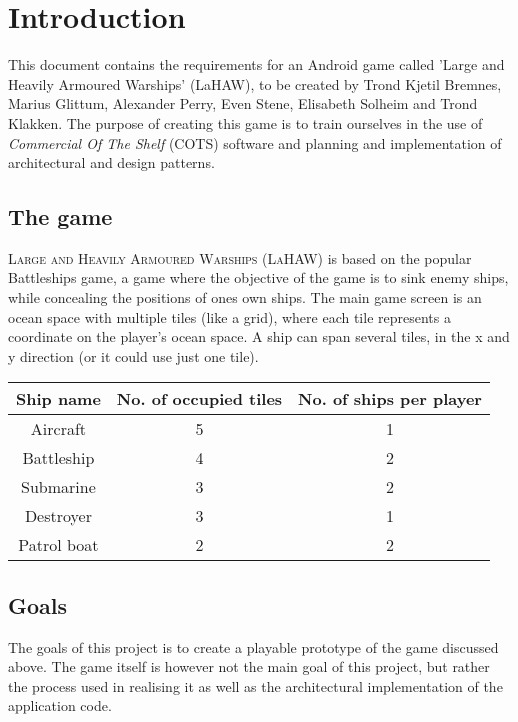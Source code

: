 \chapter{Introduction}
This document contains the requirements for an Android game called 'Large and Heavily Armoured Warships' (LaHAW), to be created by Trond Kjetil Bremnes, Marius Glittum, Alexander Perry, Even Stene, Elisabeth Solheim and Trond Klakken. The purpose of creating this game is to train ourselves in the use of \emph{Commercial Of The Shelf} (COTS) software and planning and implementation of architectural and design patterns.




\section{The game}
\textsc{Large and Heavily Armoured Warships (LaHAW)} is based on the popular Battleships\cite{battleship} game, a game where the objective of the game is to sink enemy ships, while concealing the positions of ones own ships. The main game screen is an ocean space with multiple tiles (like a grid), where each tile represents a coordinate on the player's ocean space. A ship can span several tiles, in the x and y direction (or it could use just one tile). 

\vspace{0.5cm}


\begin{tabular}{| c | c | c |}
    \hline
    \rowcolor[gray]{0.8}
    \hspace{0.3cm}\textbf{Ship name}\hspace{0.3cm} & \textbf{No. of occupied tiles} & \textbf{No. of ships per player} \\
    \hline
    Aircraft & 5 & 1 \\
    Battleship & 4 & 2 \\
    Submarine & 3 & 2 \\
    Destroyer & 3 & 1 \\
    Patrol boat & 2 & 2 \\
    \hline
\end{tabular}
\label{shiptable}





\section{Goals}
The goals of this project is to create a playable prototype of the game discussed above. The game itself is however not the main goal of this project, but rather the process used in realising it as well as the architectural implementation of the application code.



